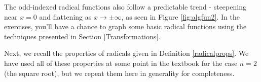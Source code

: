 
The odd-indexed radical functions also follow a predictable trend - steepening near $x = 0$ and flattening as $x \rightarrow \pm \infty$, as seen in Figure \ref{fig:algfun2}.  In the exercises, you'll have a chance to graph some basic radical functions using the techniques presented in Section \ref{Transformations}.

Next, we recall the properties of radicals given in Definition \ref{radicalprops}. We have used all of these properties at some point in the textbook for the case $n=2$ (the square root), but we repeat them here in generality for completeness.


\smallskip


